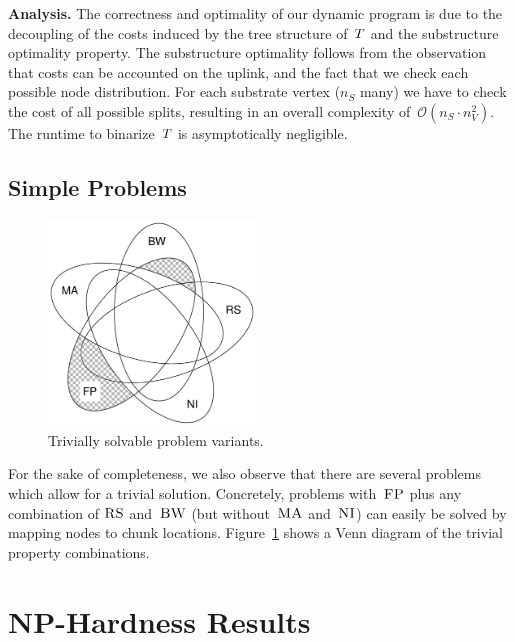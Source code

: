 \textbf{Analysis.}
The correctness and optimality of our dynamic program
is due to the decoupling of the costs induced by the tree
structure of~$T$ and the  substructure
optimality property.
The substructure optimality follows from the observation that
costs can be accounted on the uplink, and the fact
 that we check each possible node distribution.
For each substrate vertex ($n_S$ many) we have
to check the cost of all possible splits,
resulting in an overall complexity of~$\mathcal{O}(n_S \cdot n_V^2)$.
The runtime to binarize~$T$ is asymptotically negligible.


\subsection{Simple Problems}

\begin{figure}
\centering
\includegraphics[width=0.49\textwidth]{figs/static-mapping/venn_trivial.pdf}
\caption{Trivially solvable problem variants.}
\label{fig:venn_trivial}
\end{figure}


For the sake of completeness, we also observe that there are
several problems which
allow for a trivial solution. Concretely, problems with~$\textsc{FP}$
plus any combination of
$\textsc{RS}$ and~$\textsc{BW}$ (but without~$\textsc{MA}$ and~$\textsc{NI}$) can easily be solved by
mapping
nodes to chunk locations.
Figure~\ref{fig:venn_trivial}
shows a Venn diagram of the trivial property combinations.

\section{NP-Hardness Results}\label{sec:np}

